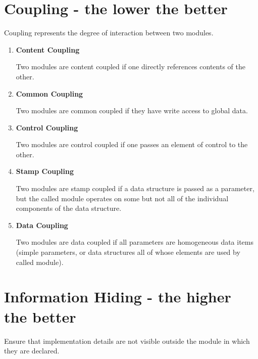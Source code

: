 \documentclass[11pt]{article}
\begin{document}
\section*{Coupling - the lower the better}

Coupling represents the degree of interaction between two modules.

\begin{enumerate}
	\item \textbf{Content Coupling}
	
	Two modules are content coupled if one directly references contents of the other.

	\item \textbf{Common Coupling}
	
	Two modules are common coupled if they have write access to global data.
	
	\item \textbf{Control Coupling}
	
	Two modules are control coupled if one passes an element of control to the other.
	
	\item \textbf{Stamp Coupling}
	
	Two modules are stamp coupled if a data structure is passed as a parameter, but the called module operates on some but not all of the individual components of the data structure.

	\item \textbf{Data Coupling}
	
	Two modules are data coupled if all parameters are homogeneous data items (simple parameters, or data structures all of whose elements are used by called module).
	
\end{enumerate}

\section*{Information Hiding - the higher the better}

Ensure that implementation details are not visible outside the module in which they are declared.
\end{document}
